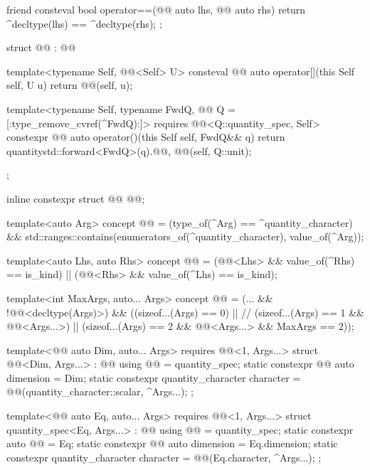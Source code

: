\begin{codeblock}
{{  friend consteval bool operator==(@@ auto lhs, @@ auto rhs)
  {
    return ^decltype(lhs) == ^decltype(rhs);
  }
};

struct @@ : @@ {
  template<typename Self, @@<Self{}> U>
  consteval @@ auto operator[](this Self self, U u)
  {
    return @@(self, u);
  }

  template<typename Self, typename FwdQ, @@ Q = [:type_remove_cvref(^FwdQ):]>
    requires @@<Q::quantity_spec, Self{}>
  constexpr @@ auto operator()(this Self self, FwdQ&& q)
  {
    return quantity{std::forward<FwdQ>(q).@@, @@(self, Q::unit)};
  }
};

inline constexpr struct @@ {
} @@;

template<auto Arg>
concept @@ =
  (type_of(^Arg) == ^quantity_character) &&
  std::ranges::contains(enumerators_of(^quantity_character), value_of(^Arg));

template<auto Lhs, auto Rhs>
concept @@ = (@@<Lhs> && value_of(^Rhs) == is_kind) ||
                               (@@<Rhs> && value_of(^Lhs) == is_kind);

template<int MaxArgs, auto... Args>
concept @@ =
  (... && !@@<decltype(Args)>) &&
  ((sizeof...(Args) == 0) ||  //
   (sizeof...(Args) == 1 && @@<Args...>) ||
   (sizeof...(Args) == 2 && @@<Args...> && MaxArgs == 2));

template<@@ auto Dim, auto... Args>
  requires @@<1, Args...>
struct @@<Dim, Args...> : @@ {
  using @@ = quantity_spec;
  static constexpr @@ auto dimension = Dim;
  static constexpr quantity_character character =
    @@(quantity_character::scalar, {^Args...});
};

template<@@ auto Eq, auto... Args>
  requires @@<1, Args...>
struct quantity_spec<Eq, Args...> : @@ {
  using @@ = quantity_spec;
  static constexpr auto @@ = Eq;
  static constexpr @@ auto dimension = Eq.dimension;
  static constexpr quantity_character character =
    @@(Eq.character, {^Args...});
};

}
\end{codeblock}
